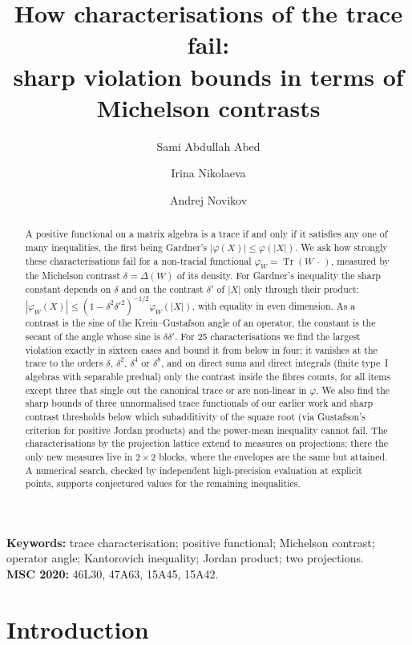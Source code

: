 \documentclass[11pt]{article}
\title{How characterisations of the trace fail:\\
sharp violation bounds in terms of Michelson contrasts}
\author{Sami Abdullah Abed \and Irina Nikolaeva \and Andrej Novikov}
\date{}
\DeclareMathOperator{\Tr}{Tr}
\theoremstyle{plain}
\theoremstyle{definition}
\theoremstyle{remark}
\begin{document}
\maketitle

\begin{abstract}
A positive functional on a matrix algebra is a trace if and only if it satisfies any one of many inequalities, the
first being Gardner's $|\varphi(X)|\le\varphi(|X|)$. We ask how strongly these characterisations fail for a non-tracial
functional $\varphi_W=\Tr(W\,\cdot\,)$, measured by the Michelson contrast $\delta=\Delta(W)$ of its density. For
Gardner's inequality the sharp constant depends on $\delta$ and on the contrast $\delta'$ of $|X|$ only through their
product: $|\varphi_W(X)|\le(1-\delta^2\delta'^2)^{-1/2}\varphi_W(|X|)$, with equality in even dimension. As a contrast is
the sine of the Krein--Gustafson angle of an operator, the constant is the secant of the angle whose sine is
$\delta\delta'$. For 25 characterisations we find the largest violation exactly in sixteen cases and bound it from below
in four; it vanishes at the trace to the orders $\delta$, $\delta^2$, $\delta^4$ or $\delta^8$, and on direct sums and
direct integrals (finite type~I algebras with separable predual) only the contrast inside the fibres counts, for all items
except three that single out the canonical trace or are non-linear in $\varphi$. We also find
the sharp bounds of three unnormalised trace functionals of our earlier work and sharp contrast thresholds below which subadditivity of the square root (via Gustafson's criterion for
positive Jordan products) and the power-mean inequality cannot fail. The characterisations by the projection lattice
extend to measures on projections; there the only new measures live in $2\times2$ blocks, where the envelopes are the same
but attained. A numerical search, checked by independent high-precision evaluation at explicit points, supports conjectured values for the
remaining inequalities.
\end{abstract}

\noindent\textbf{Keywords:} trace characterisation; positive functional; Michelson contrast; operator angle;
Kantorovich inequality; Jordan product; two projections.\\
\textbf{MSC 2020:} 46L30, 47A63, 15A45, 15A42.

\section{Introduction}\label{sec:intro}
\end{document}
